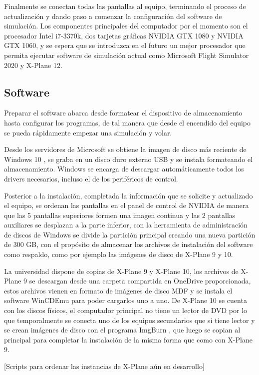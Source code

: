 Finalmente se conectan todas las pantallas al equipo, terminando el proceso de actualización y dando paso a comenzar la configuración del software de simulación. Los componentes principales del computador por el momento son el procesador Intel i7-3370k, dos tarjetas gráficas NVIDIA GTX 1080 y NVIDIA GTX 1060, y se espera que se introduzca en el futuro un mejor procesador que permita ejecutar software de simulación actual como Microsoft Flight Simulator 2020 y X-Plane 12.

\subsection{Software}

Preparar el software abarca desde formatear el dispositivo de almacenamiento hasta configurar los programas, de tal manera que desde el encendido del equipo se pueda rápidamente empezar una simulación y volar.

Desde los servidores de Microsoft se obtiene la imagen de disco más reciente de Windows 10 \cite{windows}, se graba en un disco duro externo USB y se instala formateando el almacenamiento. Windows se encarga de descargar automáticamente todos los drivers necesarios, incluso el de los periféricos de control.

Posterior a la instalación, completada la información que se solicite y actualizado el equipo, se ordenan las pantallas en el panel de control de NVIDIA de manera que las 5 pantallas superiores formen una imagen continua y las 2 pantallas auxiliares se desplazan a la parte inferior, con la herramienta de administración de discos de Windows se divide la partición principal creando una nueva partición de 300 GB, con el propósito de almacenar los archivos de instalación del software como respaldo, como por ejemplo las imágenes de disco de X-Plane 9 y 10.

La universidad dispone de copias de X-Plane 9 y X-Plane 10, los archivos de X-Plane 9 se descargan desde una carpeta compartida en OneDrive proporcionada, estos archivos vienen en formato de imágenes de disco MDF y se instala el software WinCDEmu \cite{wincdemu} para poder cargarlos uno a uno. De X-Plane 10 se cuenta con los discos físicos, el computador principal no tiene un lector de DVD por lo que temporalmente se conecta uno de los equipos secundarios que si tiene lector y se crean imágenes de disco con el programa ImgBurn \cite{imgburn}, que luego se copian al principal para completar la instalación de la misma forma que como con X-Plane 9.

[Scripts para ordenar las instancias de X-Plane aún en desarrollo]